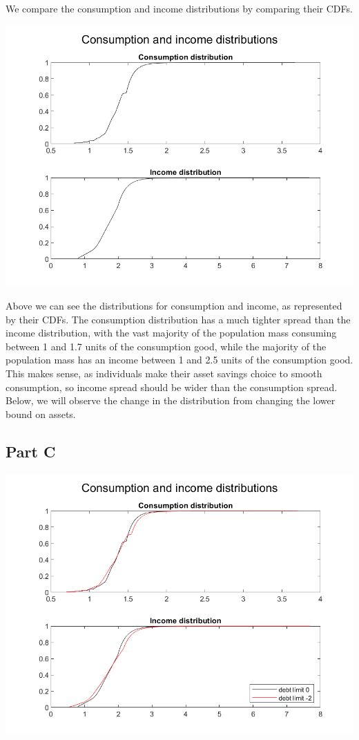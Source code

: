 \documentclass[11pt]{article} %
\begin{document}
We compare the consumption and income distributions by comparing their CDFs.

\includegraphics{dis}

Above we can see the distributions for consumption and income, as represented by their CDFs. The consumption distribution has a much tighter spread than the income distribution, with the vast majority of the population mass consuming between 1 and 1.7 units of the consumption good, while the majority of the population mass has an income between 1 and 2.5 units of the consumption good. This makes sense, as individuals make their asset savings choice to smooth consumption, so income spread should be wider than the consumption spread. Below, we will observe the change in the distribution from changing the lower bound on assets.

\subsection{Part C}

\includegraphics{comp}
\end{document}
